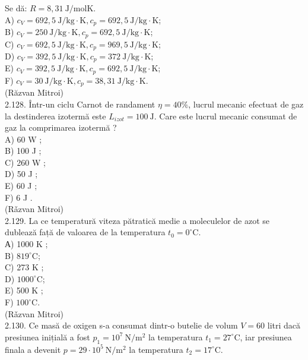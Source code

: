 \documentclass[10pt]{article}
\begin{document}
Se dă: $R=8,31 \mathrm{~J} / \mathrm{molK}$.\\
A) $c_{V}=692,5 \mathrm{~J} / \mathrm{kg} \cdot \mathrm{K}, c_{p}=692,5 \mathrm{~J} / \mathrm{kg} \cdot \mathrm{K}$;\\
B) $c_{V}=250 \mathrm{~J} / \mathrm{kg} \cdot \mathrm{K}, c_{p}=692,5 \mathrm{~J} / \mathrm{kg} \cdot \mathrm{K}$;\\
C) $c_{V}=692,5 \mathrm{~J} / \mathrm{kg} \cdot \mathrm{K}, c_{p}=969,5 \mathrm{~J} / \mathrm{kg} \cdot \mathrm{K}$;\\
D) $c_{V}=392,5 \mathrm{~J} / \mathrm{kg} \cdot \mathrm{K}, c_{p}=372 \mathrm{~J} / \mathrm{kg} \cdot \mathrm{K}$;\\
E) $c_{V}=392,5 \mathrm{~J} / \mathrm{kg} \cdot \mathrm{K}, c_{p}=692,5 \mathrm{~J} / \mathrm{kg} \cdot \mathrm{K}$;\\
F) $c_{V}=30 \mathrm{~J} / \mathrm{kg} \cdot \mathrm{K}, c_{p}=38,31 \mathrm{~J} / \mathrm{kg} \cdot \mathrm{K}$.\\
(Răzvan Mitroi)\\
2.128. Într-un ciclu Carnot de randament $\eta=40 \%$, lucrul mecanic efectuat de gaz la destinderea izotermă este $L_{i z o t}=100 \mathrm{~J}$. Care este lucrul mecanic consumat de gaz la comprimarea izotermă ?\\
A) 60 W ;\\
B) 100 J ;\\
C) 260 W ;\\
D) 50 J ;\\
E) 60 J ;\\
F) 6 J .\\
(Rǎzvan Mitroi)\\
2.129. La ce temperatură viteza pătratică medie a moleculelor de azot se dublează față de valoarea de la temperatura $t_{0}=0^{\circ} \mathrm{C}$.\\
А) 1000 K ;\\
B) $819^{\circ} \mathrm{C}$;\\
C) 273 K ;\\
D) $1000^{\circ} \mathrm{C}$;\\
E) 500 K ;\\
F) $100^{\circ} \mathrm{C}$.\\
(Rǎzvan Mitroi)\\
2.130. Ce masă de oxigen s-a consumat dintr-o butelie de volum $V=60$ litri dacă presiunea inițială a fost $p_{1}=10^{7} \mathrm{~N} / \mathrm{m}^{2}$ la temperatura $t_{1}=27^{\circ} \mathrm{C}$, iar presiunea finala a devenit $p=29 \cdot 10^{5} \mathrm{~N} / \mathrm{m}^{2}$ la temperatura $t_{2}=17^{\circ} \mathrm{C}$.
\end{document}
